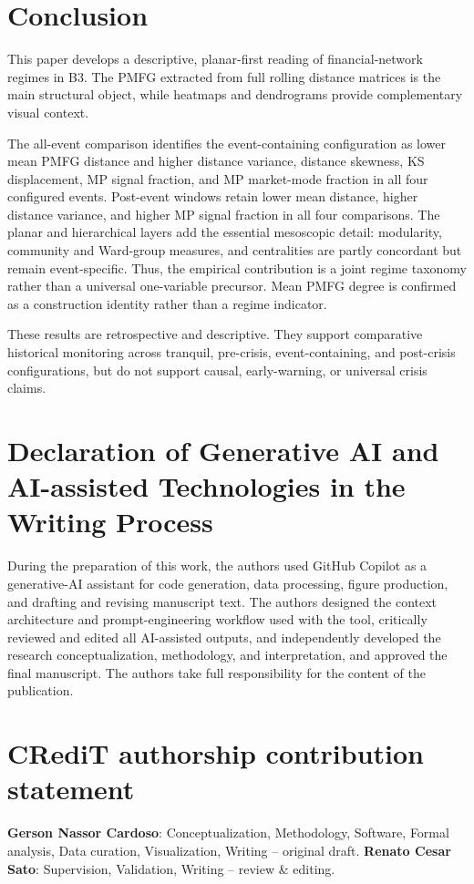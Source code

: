 \documentclass[a4paper,fleqn,review]{cas-sc}
\begin{document}
\section{Conclusion}
\label{sec:conclusion}


This paper develops a descriptive, planar-first reading of financial-network regimes in B3. The PMFG extracted from full rolling distance matrices is the main structural object, while heatmaps and dendrograms provide complementary visual context.

The all-event comparison identifies the event-containing configuration as lower mean PMFG distance and higher distance variance, distance skewness, KS displacement, MP signal fraction, and MP market-mode fraction in all four configured events. Post-event windows retain lower mean distance, higher distance variance, and higher MP signal fraction in all four comparisons. The planar and hierarchical layers add the essential mesoscopic detail: modularity, community and Ward-group measures, and centralities are partly concordant but remain event-specific. Thus, the empirical contribution is a joint regime taxonomy rather than a universal one-variable precursor. Mean PMFG degree is confirmed as a construction identity rather than a regime indicator.

These results are retrospective and descriptive. They support comparative historical monitoring across tranquil, pre-crisis, event-containing, and post-crisis configurations, but do not support causal, early-warning, or universal crisis claims.

\section*{Declaration of Generative AI and AI-assisted Technologies in the Writing Process}
During the preparation of this work, the authors used GitHub Copilot as a generative-AI assistant for code generation, data processing, figure production, and drafting and revising manuscript text. The authors designed the context architecture and prompt-engineering workflow used with the tool, critically reviewed and edited all AI-assisted outputs, and independently developed the research conceptualization, methodology, and interpretation, and approved the final manuscript. The authors take full responsibility for the content of the publication.

\section*{CRediT authorship contribution statement}
\textbf{Gerson Nassor Cardoso}: Conceptualization, Methodology, Software, Formal analysis, Data curation, Visualization, Writing -- original draft.
\textbf{Renato Cesar Sato}: Supervision, Validation, Writing -- review \& editing.
\end{document}
